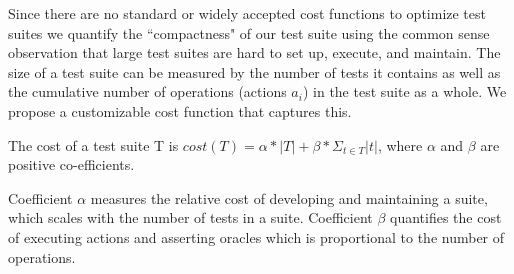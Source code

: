 Since there are no standard or widely accepted cost functions to optimize test suites we quantify the ``compactness"  of our test suite using the common sense observation that large test suites are hard to set up, execute, and maintain. The size of a test suite can be measured by the number of tests it contains as well as the cumulative number of operations (actions $a_i$) in the test suite as a whole.
We propose a customizable cost function that captures this.


\begin{mydef}
\label{def:costfunction}
The cost of a test suite T is $cost(T) = \alpha * |T| + \beta * \Sigma_{t \in T} |t|$, where $\alpha$ and $\beta$ are positive co-efficients. \end{mydef}
\vspace*{-2ex}

Coefficient $\alpha$ measures the relative cost of developing and maintaining a suite, which scales with the number of tests in a suite. Coefficient $\beta$ quantifies the cost of executing actions and asserting oracles which is proportional to the number of operations.
